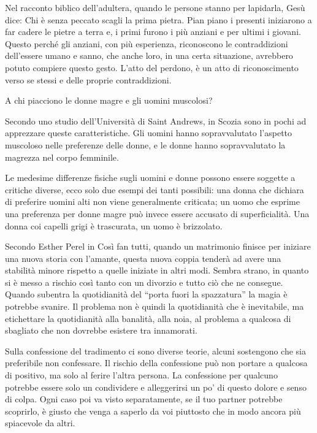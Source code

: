 \documentclass[12pt]{book} %
\begin{document}
Nel racconto biblico dell'adultera, quando le persone stanno per lapidarla, Gesù dice: Chi è senza peccato scagli la prima pietra. Pian piano i presenti iniziarono a far cadere le pietre a terra e, i primi furono i più anziani e per ultimi i giovani. Questo perché gli anziani, con più esperienza, riconoscono le contraddizioni dell'essere umano e sanno, che anche loro, in una certa situazione, avrebbero potuto compiere questo gesto. L'atto del perdono, è un atto di riconoscimento verso se stessi e delle proprie contraddizioni.

\begin{mdframed}[linewidth=1pt]
A chi piacciono le donne magre e gli uomini muscolosi?

Secondo uno studio dell'Università di Saint Andrews, in Scozia sono in pochi ad apprezzare queste caratteristiche. Gli uomini hanno sopravvalutato l'aspetto muscoloso nelle preferenze delle donne, e le donne hanno sopravvalutato la magrezza nel corpo femminile.

Le medesime differenze fisiche sugli uomini e donne possono essere soggette a critiche diverse, ecco solo due esempi dei tanti possibili: una donna che dichiara di preferire uomini alti non viene generalmente criticata; un uomo che esprime una preferenza per donne magre può invece essere accusato di superficialità. Una donna coi capelli grigi è trascurata, un uomo è brizzolato.
\end{mdframed}

Secondo Esther Perel in Così fan tutti, quando un matrimonio finisce per iniziare una nuova storia con l'amante, questa nuova coppia tenderà ad avere una stabilità minore rispetto a quelle iniziate in altri modi. Sembra strano, in quanto si è messo a rischio così tanto con un divorzio e tutto ciò che ne consegue. Quando subentra la quotidianità del “porta fuori la spazzatura” la magia è potrebbe svanire. Il problema non è quindi la quotidianità che è inevitabile, ma etichettare la quotidianità alla banalità, alla noia, al problema a qualcosa di sbagliato che non dovrebbe esistere tra innamorati.

Sulla confessione del tradimento ci sono diverse teorie, alcuni sostengono che sia preferibile non confessare. Il rischio della confessione può non portare a qualcosa di positivo, ma solo al ferire l'altra persona. La confessione per qualcuno potrebbe essere solo un condividere e alleggerirsi un po' di questo dolore e senso di colpa. Ogni caso poi va visto separatamente, se il tuo partner potrebbe scoprirlo, è giusto che venga a saperlo da voi piuttosto che in modo ancora più spiacevole da altri.
\end{document}
